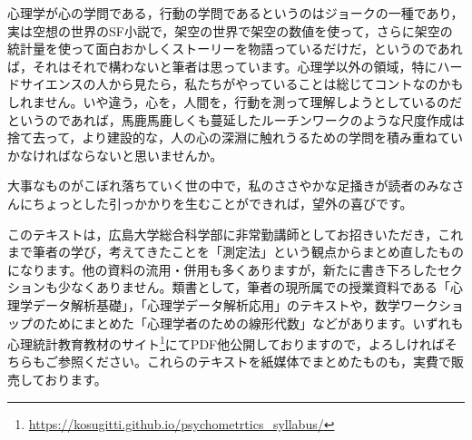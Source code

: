 \documentclass{ltjsbook}
\begin{document}
心理学が心の学問である，行動の学問であるというのはジョークの一種であり，実は空想の世界のSF小説で，架空の世界で架空の数値を使って，さらに架空の統計量を使って面白おかしくストーリーを物語っているだけだ，というのであれば，それはそれで構わないと筆者は思っています。心理学以外の領域，特にハードサイエンスの人から見たら，私たちがやっていることは総じてコントなのかもしれません。いや違う，心を，人間を，行動を測って理解しようとしているのだというのであれば，馬鹿馬鹿しくも蔓延したルーチンワークのような尺度作成は捨て去って，より建設的な，人の心の深淵に触れうるための学問を積み重ねていかなければならないと思いませんか。

大事なものがこぼれ落ちていく世の中で，私のささやかな足掻きが読者のみなさんにちょっとした引っかかりを生むことができれば，望外の喜びです。

\vspace{2cm}
このテキストは，広島大学総合科学部に非常勤講師としてお招きいただき，これまで筆者の学び，考えてきたことを「測定法」という観点からまとめ直したものになります。他の資料の流用・併用も多くありますが，新たに書き下ろしたセクションも少なくありません。類書として，筆者の現所属での授業資料である「心理学データ解析基礎」，「心理学データ解析応用」のテキストや，数学ワークショップのためにまとめた「心理学者のための線形代数」などがあります。いずれも心理統計教育教材のサイト\footnote{\url{https://kosugitti.github.io/psychometrtics_syllabus/}}にてPDF他公開しておりますので，よろしければそちらもご参照ください。これらのテキストを紙媒体でまとめたものも，実費で販売しております。
\end{document}
